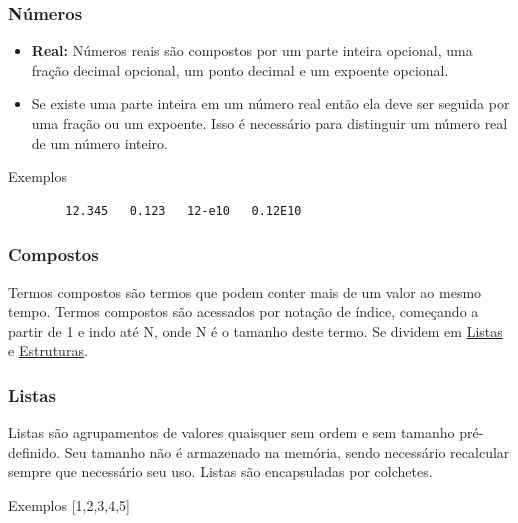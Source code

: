 \begin{frame}[fragile]
	\frametitle{Números \textrm{\MakeUppercase{}}}
	
	\begin{itemize}
		
		\item \textbf{Real:} Números reais são compostos por um parte inteira opcional, uma 
		fração decimal opcional, um ponto decimal e um expoente opcional.
		
		\item Se existe uma parte inteira em um número real então ela deve ser seguida por uma
		fração ou um expoente. Isso é necessário para distinguir um número real de um número inteiro.
	\end{itemize}
	
	\begin{exampleblock}{Exemplos}
		\begin{verbatim}
		12.345   0.123   12-e10   0.12E10
		\end{verbatim}
	\end{exampleblock}
	
\end{frame}


\begin{frame}
	\frametitle{Compostos}
	
	Termos compostos são termos que podem conter mais de um valor ao mesmo tempo. Termos compostos são 
	acessados por notação de índice, começando a partir de 1 e indo até N, onde N é o tamanho deste termo.
	Se dividem em \underline{Listas} e \underline{Estruturas}.
	
\end{frame}


\begin{frame}
	\frametitle{Listas}
	
	Listas são agrupamentos de valores quaisquer sem ordem e sem tamanho pré-definido. Seu tamanho não é 
	armazenado na memória, sendo necessário recalcular sempre que necessário seu uso. Listas são 
	encapsuladas por colchetes.
	
	\begin{exampleblock}{Exemplos}
		[1,2,3,4,5] \: [a,b,32,1.5,aaac] \: ["string",14,22]
	\end{exampleblock}
	
\end{frame}

